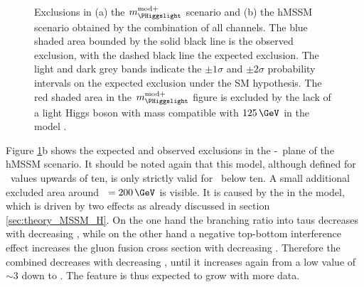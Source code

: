 \begin{figure}[h!]
\begin{center}
~\\
\end{center}
\caption[Exclusions in the $m_{\PHiggslight}^{\text{mod+}}$ scenario and the hMSSM
scenario of the \mbox{\AHtotautau} analysis.]{Exclusions in (a) the $m_{\PHiggslight}^{\text{mod}+}$ scenario and (b) the hMSSM scenario 
obtained by the combination
of all channels. The blue shaded area bounded by the 
solid black line is the observed exclusion, with the dashed black line the
expected exclusion. The light and dark grey bands indicate
the $\pm 1\sigma$ and $\pm 2\sigma$ probability intervals on the expected exclusion under the \ac{SM} hypothesis.
The red shaded area in the $m_{\PHiggslight}^{\text{mod}+}$ figure
is excluded by the lack of a light Higgs boson with mass compatible with $125\,\GeV$ in the model \cite{CMS-PAS-HIG-16-037}.}
\label{fig:mssm_mhmodp_2016}
\end{figure}

Figure \ref{fig:mssm_mhmodp_2016}b shows the expected
and observed exclusions
in the \mA-\tanb~plane of the hMSSM scenario. 
It should be noted again that this model, although defined for \tanb~values
upwards of ten, is only strictly valid for \tanb~below ten.
A small additional excluded area around \mA~$=200\,\GeV$ is visible.
It is caused by the 
\xsbr in the model, which is driven by
two effects as already discussed in section \ref{sec:theory_MSSM_H}. On the one hand the branching ratio into taus decreases with decreasing
\tanb, while on the other hand a negative top-bottom interference effect increases the
gluon fusion cross section with decreasing \tanb. Therefore the
combined \xsbr decreases with decreasing \tanb, until it
increases again from a low value of \tanb~$\sim 3$ down to . The feature is 
thus expected to grow with more data.


